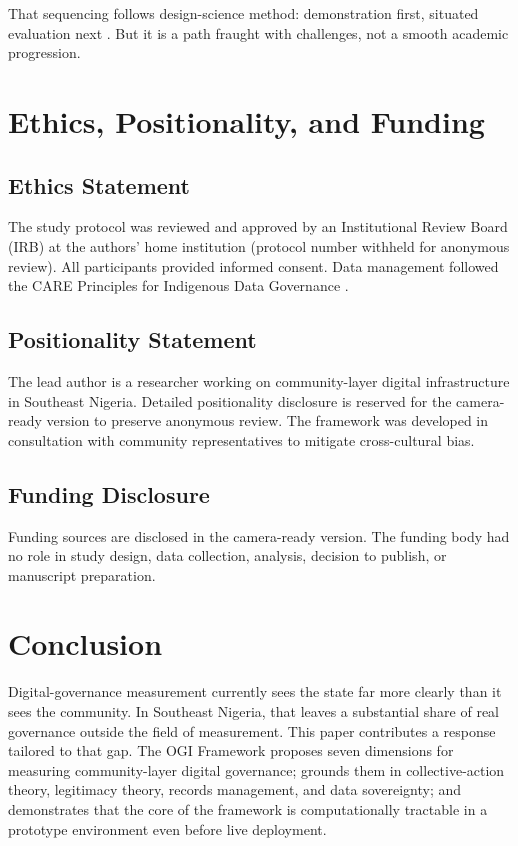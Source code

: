 \documentclass[sigconf,anonymous]{acmart}
\begin{document}
That sequencing follows design-science method: demonstration first, situated evaluation next \cite{hevner2004, dresch2015}. But it is a path fraught with challenges, not a smooth academic progression.

\section{Ethics, Positionality, and Funding}

\subsection{Ethics Statement}

The study protocol was reviewed and approved by an Institutional Review Board (IRB) at the authors' home institution (protocol number withheld for anonymous review). All participants provided informed consent. Data management followed the CARE Principles for Indigenous Data Governance \cite{carroll2020}.

\subsection{Positionality Statement}

The lead author is a researcher working on community-layer digital infrastructure in Southeast Nigeria. Detailed positionality disclosure is reserved for the camera-ready version to preserve anonymous review. The framework was developed in consultation with community representatives to mitigate cross-cultural bias.

\subsection{Funding Disclosure}

Funding sources are disclosed in the camera-ready version. The funding body had no role in study design, data collection, analysis, decision to publish, or manuscript preparation.

\section{Conclusion}

Digital-governance measurement currently sees the state far more clearly than it sees the community. In Southeast Nigeria, that leaves a substantial share of real governance outside the field of measurement. This paper contributes a response tailored to that gap. The OGI Framework proposes seven dimensions for measuring community-layer digital governance; grounds them in collective-action theory, legitimacy theory, records management, and data sovereignty; and demonstrates that the core of the framework is computationally tractable in a prototype environment even before live deployment.
\end{document}
